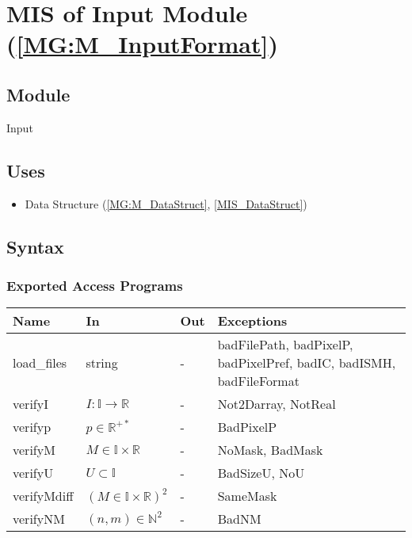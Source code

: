 \documentclass[12pt, titlepage]{article}
\begin{document}
\section{MIS of Input Module (\texorpdfstring{\cref{MG:M_InputFormat}}))} 
\label{MIS_Input}



\subsection{Module}
Input
\subsection{Uses}
\begin{itemize}
\item Data Structure (\cref{MG:M_DataStruct}, \cref{MIS_DataStruct})
\end{itemize}

\subsection{Syntax}

\subsubsection{Exported Access Programs}

\begin{center}
\begin{tabular}{p{2cm} p{3cm} p{1cm} p{7cm}}
\hline
\textbf{Name} & \textbf{In} & \textbf{Out} & \textbf{Exceptions} \\
\hline
load{\_}files & string & - & badFilePath, badPixelP, badPixelPref, badIC, 
badISMH, badFileFormat \\
verifyI & $I:\mathbb{I}\rightarrow\mathbb{R}$ & - & Not2Darray, NotReal\\
verifyp & $p \in \mathbb{R}^{+*}$ & - & BadPixelP\\
verifyM & $M \in \mathbb{I} \times \mathbb{R}$ & - & NoMask, BadMask \\
verifyU & $U \subset \mathbb{I}$ & - & BadSizeU, NoU \\
verifyMdiff & $(M \in \mathbb{I} \times \mathbb{R})^2$ & - & SameMask \\
verifyNM & $(n,m)\in\mathbb{N}^2$ & - & BadNM\\
\hline
\end{tabular}
\end{center}
\end{document}
